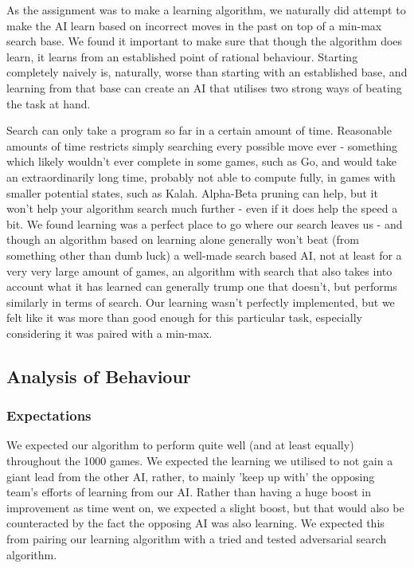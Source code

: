 \documentclass[11pt]{article}
\begin{document}
As the assignment was to make a learning algorithm, we naturally did attempt to make the AI learn based on incorrect moves in the past on top of a min-max search base. We found it important to make sure that though the algorithm does learn, it learns from an established point of rational behaviour. Starting completely naively is, naturally, worse than starting with an established base, and learning from that base can create an AI that utilises two strong ways of beating the task at hand.

Search can only take a program so far in a certain amount of time. Reasonable amounts of time restricts simply searching every possible move ever - something which likely wouldn't ever complete in some games, such as Go, and would take an extraordinarily long time, probably not able to compute fully, in games with smaller potential states, such as Kalah. Alpha-Beta pruning can help, but it won't help your algorithm search much further - even if it does help the speed a bit. We found learning was a perfect place to go where our search leaves us - and though an algorithm based on learning alone generally won't beat (from something other than dumb luck) a well-made search based AI, not at least for a very very large amount of games, an algorithm with search that also takes into account what it has learned can generally trump one that doesn't, but performs similarly in terms of search. Our learning wasn't perfectly implemented, but we felt like it was more than good enough for this particular task, especially considering it was paired with a min-max.
\subsection{Analysis of Behaviour}
\label{sec-3-3}

\subsubsection{Expectations}
\label{sec-3-3-1}

We expected our algorithm to perform quite well (and at least equally) throughout the 1000 games. We expected the learning we utilised to not gain a giant lead from the other AI, rather, to mainly 'keep up with' the opposing team's efforts of learning from our AI. Rather than having a huge boost in improvement as time went on, we expected a slight boost, but that would also be counteracted by the fact the opposing AI was also learning. We expected this from pairing our learning algorithm with a tried and tested adversarial search algorithm.
\end{document}
